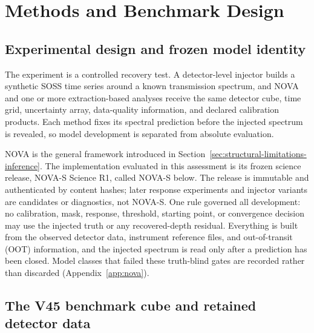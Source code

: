 \section{Methods and Benchmark Design}
\label{sec:methods}

\subsection{Experimental design and frozen model identity}


The experiment is a controlled recovery test. A detector-level injector
builds a synthetic SOSS time series around a known transmission spectrum,
and NOVA and one or more extraction-based analyses receive the same detector
cube, time grid, uncertainty array, data-quality information, and declared
calibration products. Each method fixes its spectral prediction before the
injected spectrum is revealed, so model development is separated from
absolute evaluation.

NOVA is the general framework introduced in
Section~\ref{sec:structural-limitations-inference}. The implementation
evaluated in this assessment is its frozen science release, NOVA-S
Science R1, called NOVA-S below. The release is immutable and authenticated
by content hashes; later response experiments and injector variants are
candidates or diagnostics, not NOVA-S. One rule governed all development: no
calibration, mask, response, threshold, starting point, or convergence
decision may use the injected truth or any recovered-depth residual.
Everything is built from the observed detector data, instrument reference
files, and out-of-transit (OOT) information, and the injected spectrum is
read only after a prediction has been closed. Model classes that failed
these truth-blind gates are recorded rather than discarded
(Appendix~\ref{app:nova}).

\subsection{The V45 benchmark cube and retained detector data}


